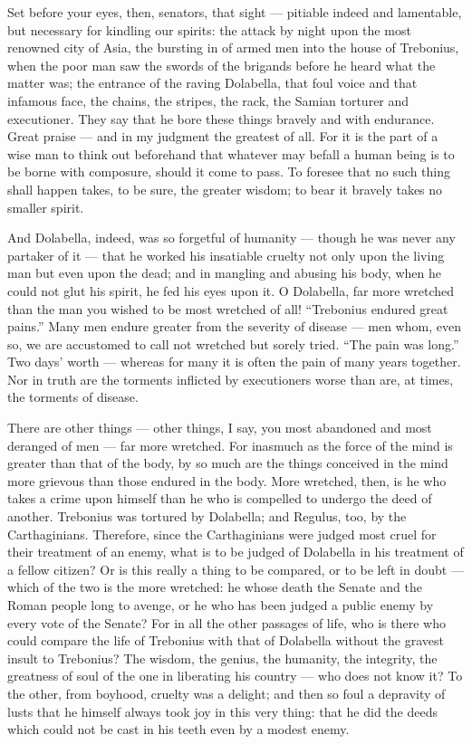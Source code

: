  Set before your eyes, then, senators, that sight --- pitiable indeed and lamentable, but necessary for kindling our spirits: the attack by night upon the most renowned city of Asia, the bursting in of armed men into the house of Trebonius, when the poor man saw the swords of the brigands before he heard what the matter was; the entrance of the raving Dolabella, that foul voice and that infamous face, the chains, the stripes, the rack, the Samian torturer and executioner. They say that he bore these things bravely and with endurance. Great praise --- and in my judgment the greatest of all. For it is the part of a wise man to think out beforehand that whatever may befall a human being is to be borne with composure, should it come to pass. To foresee that no such thing shall happen takes, to be sure, the greater wisdom; to bear it bravely takes no smaller spirit.

 And Dolabella, indeed, was so forgetful of humanity --- though he was never any partaker of it --- that he worked his insatiable cruelty not only upon the living man but even upon the dead; and in mangling and abusing his body, when he could not glut his spirit, he fed his eyes upon it. O Dolabella, far more wretched than the man you wished to be most wretched of all! ``Trebonius endured great pains.'' Many men endure greater from the severity of disease --- men whom, even so, we are accustomed to call not wretched but sorely tried. ``The pain was long.'' Two days' worth --- whereas for many it is often the pain of many years together. Nor in truth are the torments inflicted by executioners worse than are, at times, the torments of disease.

 There are other things --- other things, I say, you most abandoned and most deranged of men --- far more wretched. For inasmuch as the force of the mind is greater than that of the body, by so much are the things conceived in the mind more grievous than those endured in the body. More wretched, then, is he who takes a crime upon himself than he who is compelled to undergo the deed of another. Trebonius was tortured by Dolabella; and Regulus, too, by the Carthaginians. Therefore, since the Carthaginians were judged most cruel for their treatment of an enemy, what is to be judged of Dolabella in his treatment of a fellow citizen? Or is this really a thing to be compared, or to be left in doubt --- which of the two is the more wretched: he whose death the Senate and the Roman people long to avenge, or he who has been judged a public enemy by every vote of the Senate? For in all the other passages of life, who is there who could compare the life of Trebonius with that of Dolabella without the gravest insult to Trebonius? The wisdom, the genius, the humanity, the integrity, the greatness of soul of the one in liberating his country --- who does not know it? To the other, from boyhood, cruelty was a delight; and then so foul a depravity of lusts that he himself always took joy in this very thing: that he did the deeds which could not be cast in his teeth even by a modest enemy.

